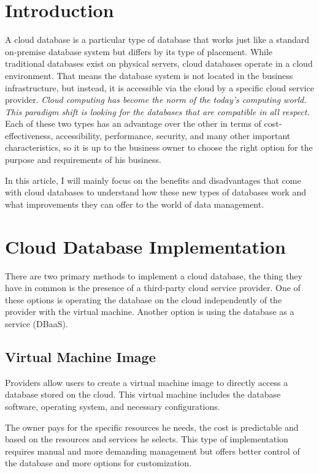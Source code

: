 \documentclass[12pt, a4paper]{article}
\begin{document}
\section{Introduction}
    A cloud database is a particular type of database that works just like a standard on-premise database system but differs by its type of placement. While traditional databases exist on physical servers, cloud databases operate in a cloud environment. That means the database system is not located in the business infrastructure, but instead, it is accessible via the cloud by a specific cloud service provider. \textit{Cloud computing has become the norm of the today's computing world. This paradigm shift is looking for the databases that are compatible in all respect.}\cite{03} Each of these two types has an advantage over the other in terms of cost-effectiveness, accessibility, performance, security, and many other important characteristics, so it is up to the business owner to choose the right option for the purpose and requirements of his business. \par In this article, I will mainly focus on the benefits and disadvantages that come with cloud databases to understand how these new types of databases work and what improvements they can offer to the world of data management.
\clearpage

\section{Cloud Database Implementation}
    There are two primary methods to implement a cloud database, the thing they have in common is the presence of a third-party cloud service provider. One of these options is operating the database on the cloud independently of the provider with the virtual machine. Another option is using the database as a service (DBaaS).
    
    \subsection{Virtual Machine Image}
        Providers allow users to create a virtual machine image to directly access a database stored on the cloud. This virtual machine includes the database software, operating system, and necessary configurations.\par The owner pays for the specific resources he needs, the cost is predictable and based on the resources and services he selects. This type of implementation requires manual and more demanding management but offers better control of the database and more options for customization.
    
\end{document}

